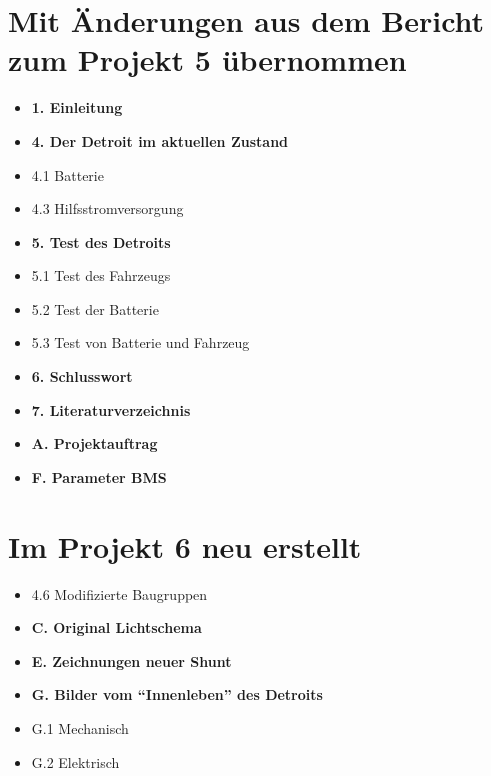 \section*{Mit Änderungen aus dem Bericht zum Projekt 5 übernommen}
\begin{itemize}[noitemsep,topsep=0pt,parsep=0pt,partopsep=0pt]
\item \textbf{1. Einleitung}
\item \textbf{4. Der Detroit im aktuellen Zustand}
\item 4.1 Batterie
\item 4.3 Hilfsstromversorgung
\item \textbf{5. Test des Detroits}
\item 5.1 Test des Fahrzeugs
\item 5.2 Test der Batterie
\item 5.3 Test von Batterie und Fahrzeug
\item \textbf{6. Schlusswort}
\item \textbf{7. Literaturverzeichnis}
\item \textbf{A. Projektauftrag}
\item \textbf{F. Parameter BMS}
\end{itemize}

\section*{Im Projekt 6 neu erstellt}
\begin{itemize}[noitemsep,topsep=0pt,parsep=0pt,partopsep=0pt]
\item 4.6 Modifizierte Baugruppen
\item \textbf{C. Original Lichtschema}
\item \textbf{E. Zeichnungen neuer Shunt}
\item \textbf{G. Bilder vom "`Innenleben"' des Detroits}
\item G.1 Mechanisch
\item G.2 Elektrisch
\end{itemize}